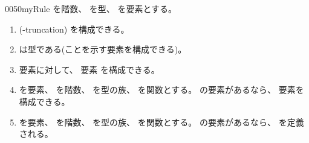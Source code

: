 \documentclass[index]{subfiles}
\begin{document}
\begin{myBlock}{0050}{myRule}
  を階数、
  を型、
  を要素とする。
  \begin{enumerate}
  \item {}
    (-truncation)
    を構成できる。
  \item {}は型である(ことを示す要素を構成できる)。
  \item 要素に対して、
    要素
    を構成できる。
  \item {}を要素、
    を階数、
    を型の族、
    を関数とする。
    の要素があるなら、
    要素を構成できる。
  \item {}を要素、
    を階数、
    を型の族、
    を関数とする。
    の要素があるなら、
    を定義される。
  \end{enumerate}
\end{myBlock}
\end{document}
